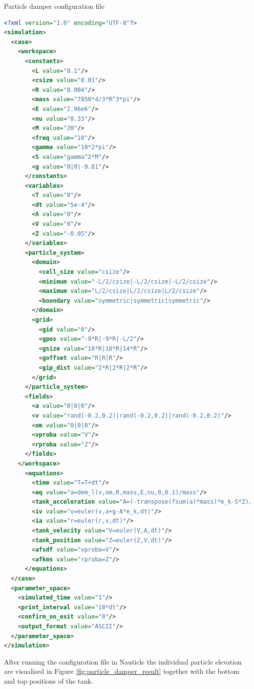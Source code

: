\documentclass[a4paper,12pt,openany]{book}
\theoremstyle{break}
\begin{document}
\begin{example}{Particle damper configuration file}{}
\lstset{basicstyle=\tiny}
\begin{lstlisting}[language=XML]
<?xml version="1.0" encoding="UTF-8"?>
<simulation>
  <case>
    <workspace>
      <constants>
        <L value="0.1"/>
        <csize value="0.01"/>
        <R value="0.004"/>
        <mass value="7850*4/3*R^3*pi"/>
        <E value="2.06e6"/>
        <nu value="0.33"/>
        <M value="20"/>
        <freq value="10"/>
        <gamma value="10*2*pi"/>
        <S value="gamma^2*M"/>
        <g value="0|0|-9.81"/>
      </constants>
      <variables>
        <T value="0"/>
        <dt value="5e-4"/>
        <A value="0"/>
        <V value="0"/>
        <Z value="-0.05"/>
      </variables>
      <particle_system>
        <domain>
          <cell_size value="csize"/>
          <minimum value="-L/2/csize|-L/2/csize|-L/2/csize"/>
          <maximum value="L/2/csize|L/2/csize|L/2/csize"/>
          <boundary value="symmetric|symmetric|symmetric"/>
        </domain>
        <grid>
          <gid value="0"/>
          <gpos value="-9*R|-9*R|-L/2"/>
          <gsize value="18*R|18*R|14*R"/>
          <goffset value="R|R|R"/>
          <gip_dist value="2*R|2*R|2*R"/>
        </grid>
      </particle_system>
      <fields>
        <a value="0|0|0"/>
        <v value="rand(-0.2,0.2)|rand(-0.2,0.2)|rand(-0.2,0.2)"/>
        <om value="0|0|0"/>
        <vproba value="V"/>
        <rproba value="Z"/>
      </fields>
    </workspace>
      <equations>
        <time value="T=T+dt"/>
        <eq value="a=dem_l(v,om,R,mass,E,nu,0,0.1)/mass"/>
        <tank_acceleration value="A=(-transpose(fsum(a)*mass)*e_k-S*Z)/M"/>
        <iv value="v=euler(v,a+g-A*e_k,dt)"/>
        <ia value="r=euler(r,v,dt)"/>
        <tank_velocity value="V=euler(V,A,dt)"/>
        <tank_position value="Z=euler(Z,V,dt)"/>
        <afsdf value="vproba=V"/>
        <afkms value="rproba=Z"/>
      </equations>
  </case>
  <parameter_space>
    <simulated_time value="1"/>
    <print_interval value="10*dt"/>
    <confirm_on_exit value="0"/>
    <output_format value="ASCII"/>
  </parameter_space>
</simulation>
\end{lstlisting}
\end{example}
After running the configuration file in Nauticle the individual particle elevation are visualised in Figure \ref{fig:particle_damper_result} together with the bottom and top positions of the tank.
\end{document}
